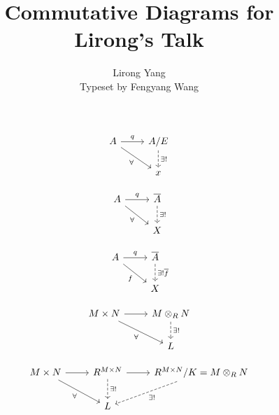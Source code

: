 \documentclass{article}
\title{Commutative Diagrams for Lirong's Talk}
\author{Lirong Yang\\Typeset by Fengyang Wang}
\begin{document}
\maketitle

\[
\begin{tikzcd}
  A \arrow[rd, "\forall" below left] \arrow[r, "q"] & A/E \arrow[d, "\exists!", dashed] \\
  & x
\end{tikzcd}
\]

\[
\begin{tikzcd}
  A \arrow[rd, "\forall" below left] \arrow[r, "q"] & \overline{A} \arrow[d, "\exists!", dashed] \\
  & X
\end{tikzcd}
\]


\[
\begin{tikzcd}
  A \arrow[rd, "f" below left] \arrow[r, "q"] &
  \overline{A} \arrow[d, "\exists!\\\overline{f}", dashed] \\
  & X
\end{tikzcd}
\]

\[
\begin{tikzcd}
  M\times N \arrow[r] \arrow[rd, "\forall" below left ] &
  M \otimes_R N \arrow[d, "\exists!", dashed]\\
  & L
\end{tikzcd}
\]

\[
\begin{tikzcd}
  M\times N \arrow[r] \arrow[rd, "\forall" below left] &
  R^{M\times N} \arrow[r] \arrow[d, "\exists!", dashed] &
  R^{M\times N}/K = M \otimes_R N \arrow[ld, "\exists!", dashed] \\
  & L &
\end{tikzcd}
\]
\end{document}
